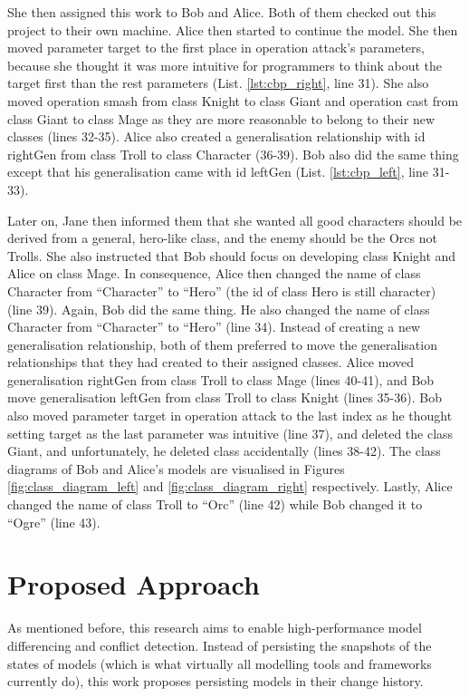 She then assigned this work to Bob and Alice. Both of them checked out this project to their own machine. Alice then started to continue the model. She then moved parameter \textsf{target} to the first place in operation \textsf{attack}'s parameters, because she thought it was more intuitive for programmers to think about the \textsf{target} first than the rest parameters (List. \ref{lst:cbp_right}, line 31). She also moved operation \textsf{smash} from class \textsf{Knight} to class \textsf{Giant} and operation \textsf{cast} from class \textsf{Giant} to class \textsf{Mage} as they are more reasonable to belong to their new classes (lines 32-35). Alice also created a generalisation relationship with id \textsf{rightGen} from class \textsf{Troll} to class \textsf{Character} (36-39). Bob also did the same thing except that his generalisation came with id \textsf{leftGen} (List. \ref{lst:cbp_left}, line 31-33). 

Later on, Jane then informed them that she wanted all good characters should be derived from a general, hero-like class, and the enemy should be the Orcs not Trolls. She also instructed that Bob should focus on developing class \textsf{Knight} and Alice on class \textsf{Mage}. In consequence, Alice then changed the name of class \textsf{Character} from ``Character'' to ``Hero'' (the id of class \textsf{Hero} is still \textsf{character}) (line 39). Again, Bob did the same thing. He also changed the name of class \textsf{Character} from ``Character'' to ``Hero'' (line 34). Instead of creating a new generalisation relationship, both of them preferred to move the generalisation relationships that they had created to their assigned classes. Alice moved generalisation \textsf{rightGen} from class \textsf{Troll} to class \textsf{Mage} (lines 40-41), and Bob move generalisation \textsf{leftGen} from class \textsf{Troll} to class \textsf{Knight} (lines 35-36). Bob also moved parameter \textsf{target} in operation \textsf{attack} to the last index as he thought setting target as the last parameter was intuitive (line 37), and deleted the class {Giant}, and unfortunately, he deleted class  accidentally (lines 38-42). The class diagrams of Bob and Alice's models are visualised in Figures \ref{fig:class_diagram_left} and \ref{fig:class_diagram_right} respectively. Lastly, Alice changed the \textsf{name} of class \textsf{Troll} to ``Orc'' (line 42) while Bob changed it to ``Ogre'' (line 43).  


\section{Proposed Approach}
\label{sec:proposed_approach}
As mentioned before, this research aims to enable high-performance model differencing and conflict detection. Instead of persisting the snapshots of the states of models (which is what virtually all modelling tools and frameworks currently do), this work proposes persisting models in their change history.

